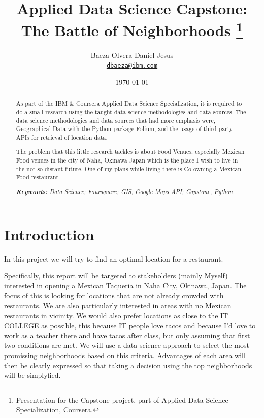 \documentclass[11pt]{article}
\title{Applied Data Science Capstone: The Battle of Neighborhoods
\thanks{Presentation for the Capstone project, part of Applied Data Science Specialization, Coursera.}
}
\author{Baeza Olvera Daniel Jesus\\%
    \href{mailto:dbaeza@ibm.com}{\texttt{dbaeza@ibm.com}} %
    }
\date{\today}
\begin{document}
{
\maketitle
\begin{abstract}
As part of the IBM \& Coursera Applied Data Science Specialization, it is required to do a small research using the taught data science methodologies and data sources.
The data science methodologies and data sources that had more emphasis were, Geographical Data with the Python package Folium, and the usage of third party APIs for retrieval of location data.
\newline

The problem that this little research tackles is about Food Venues, especially Mexican Food venues in the city of Naha, Okinawa Japan which is the place I wish to live in the not so distant future. One of my plans while living there is Co-owning a Mexican Food restaurant.
\newline

\noindent
\textit{\textbf{Keywords: }%
Data Science; Foursquare; GIS; Google Maps API; Capstone, Python.} \\ %
\end{abstract}
}


\section{Introduction}

In this project we will try to find an optimal location for a restaurant.
\newline

Specifically, this report will be targeted to stakeholders (mainly Myself) interested in opening a Mexican Taqueria in Naha City, Okinawa, Japan. The focus of this is looking for locations that are not already crowded with restaurants. We are also particularly interested in areas with no Mexican restaurants in vicinity. We would also prefer locations as close to the IT COLLEGE as possible, this because IT people love tacos and because I'd love to work as a teacher there and have tacos after class, but only assuming that first two conditions are met. We will use a data science approach to select the most promissing neighborhoods based on this criteria. Advantages of each area will then be clearly expressed so that taking a decision using the top neighborhoods will be simplyfied.
\newline
\end{document}
